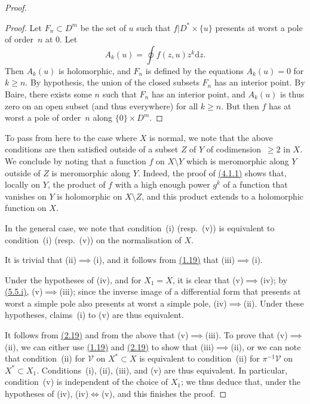 \documentclass{report}
\renewcommand{\cal}[1]{{\mathcal{#1}}}
\newcommand{\dd}{\mathrm{d}}
\renewcommand{\geq}{\geqslant}
\begin{document}
\begin{proof}
  \begin{proof}
    Let $F_n\subset D^m$ be the set of $u$ such that $f|D^*\times\{u\}$ presents at worst a pole of order~$n$ at $0$.
    Let
    \[
      A_k(u) = \oint f(z,u)z^k\dd z.
    \]
    Then $A_k(u)$ is holomorphic, and $F_n$ is defined by the equations $A_k(u)=0$ for $k\geq n$.
    By hypothesis, the union of the closed subsets $F_n$ has an interior point.
    By Baire, there exists some $n$ such that $F_n$ has an interior point, and $A_k(u)$ is thus zero on an open subset (and thus everywhere) for all $k\geq n$.
    But then $f$ has at worst a pole of order~$n$ along $\{0\}\times D^m$.
  \end{proof}

  To pass from here to the case where $X$ is normal, we note that the above conditions are then satisfied outside of a subset $Z$ of $Y$ of codimension~$\geq2$ in $X$.
  We conclude by noting that a function $f$ on $X\setminus Y$ which is meromorphic along $Y$ outside of $Z$ is meromorphic along $Y$.
  Indeed, the proof of \hyperref[II.4.1.1]{(4.1.1)} shows that, locally on $Y$, the product of $f$ with a high enough power $g^k$ of a function that vanishes on $Y$ is holomorphic on $X\setminus Z$, and this product extends to a holomorphic function on $X$.

  In the general case, we note that condition~(i) (resp.~(v)) is equivalent to condition~(i) (resp.~(v)) on the normalisation of $X$.

  It is trivial that \mbox{(ii)$\implies$(i)}, and it follows from \hyperref[II.1.19]{(1.19)} that \mbox{(iii)$\implies$(i)}.

  Under the hypotheses of (iv), and for $X_1=X$, it is clear that \mbox{(v)$\implies$(iv)};
  by \hyperref[II.5.5]{(5.5.i)}, \mbox{(v)$\implies$(iii)};
  since the inverse image of a differential form that presents at worst a simple pole also presents at worst a simple pole, \mbox{(iv)$\implies$(ii)}.
  Under these hypotheses, claims~(i) to (v) are thus equivalent.

  It follows from \hyperref[II.2.19]{(2.19)} and from the above that \mbox{(v)$\implies$(iii)}.
  To prove that \mbox{(v)$\implies$(ii)}, we can either use \hyperref[II.1.19]{(1.19)} and \hyperref[II.2.19]{(2.19)} to show that \mbox{(iii)$\implies$(ii)}, or we can note that condition~(ii) for $\cal{V}$ on $X^*\subset X$ is equivalent to condition~(ii) for $\pi^{-1}\cal{V}$ on $X^*\subset X_1$.
  Conditions~(i), (ii), (iii), and (v) are thus equivalent.
  In particular, condition~(v) is independent of the choice of $X_1$;
  we thus deduce that, under the hypotheses of (iv), \mbox{(iv)$\iff$(v)}, and this finishes the proof.
\end{proof}
\end{document}
